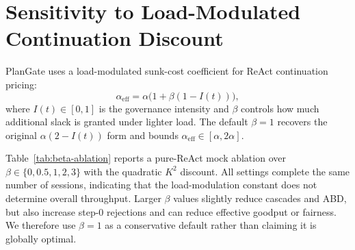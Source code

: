 \documentclass[sigconf,anonymous]{acmart}
\begin{document}
\section{Sensitivity to Load-Modulated Continuation Discount}
\label{sec:beta-sensitivity}
\label{app:beta}

PlanGate uses a load-modulated sunk-cost coefficient for ReAct continuation pricing:
\begin{equation}
\alpha_{\mathrm{eff}}=\alpha\bigl(1+\beta(1-I(t))\bigr),
\end{equation}
where $I(t)\in[0,1]$ is the governance intensity and $\beta$ controls how much additional slack is granted under lighter load. The default $\beta{=}1$ recovers the original $\alpha(2-I(t))$ form and bounds $\alpha_{\mathrm{eff}}\in[\alpha,2\alpha]$.

Table~\ref{tab:beta-ablation} reports a pure-ReAct mock ablation over $\beta\in\{0,0.5,1,2,3\}$ with the quadratic $K^2$ discount. All settings complete the same number of sessions, indicating that the load-modulation constant does not determine overall throughput. Larger $\beta$ values slightly reduce cascades and ABD, but also increase step-0 rejections and can reduce effective goodput or fairness. We therefore use $\beta{=}1$ as a conservative default rather than claiming it is globally optimal.

\begin{table}[h]
\centering
\caption{Sensitivity to the load-modulation coefficient $\beta$ in
$\alpha_{\mathrm{eff}}=\alpha(1+\beta(1-I(t)))$ under a pure-ReAct mock workload (500 sessions, 200 concurrency, 5 repeats). The default $\beta{=}1$ recovers the original $\alpha(2-I(t))$ form.}
\label{tab:beta-ablation}
\small
{}
\end{table}
\end{document}
